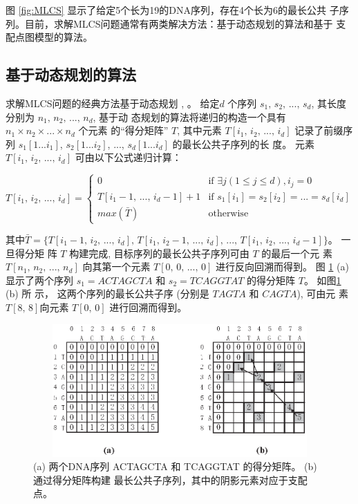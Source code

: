 图 \ref{fig:MLCS} 显示了给定5个长为19的DNA序列，存在4个长为6的最长公共
子序列。目前，求解MLCS问题通常有两类解决方法：基于动态规划的算法和基于
支配点图模型的算法。

\subsection{基于动态规划的算法}

求解MLCS问题的经典方法基于动态规划 \cite{Smith1981}, \cite{Sankoff1972}。 给定$d$
个序列 $s_1,\, s_2,\,...,\, s_d$, 其长度分别为 $n_1,\, n_2,\, ...,\, n_d$, 基于动
态规划的算法将递归的构造一个具有 $n_1 \times n_2 \times ... \times n_d$ 个元素
的“得分矩阵” $T$, 其中元素 $T[i_1,\, i_2,\, ...,\, i_d]$ 记录了前缀序
列 $s_1[1...i_1]$, $s_2[1...i_2]$, ..., $s_d[1...i_d]$ 的最长公共子序列的长
度。 元素 $T[i_1,\, i_2,\, ...,\, i_d]$ 可由以下公式递归计算：

\begin{equation}
  T[i_1,\, i_2,\, ...,\, i_d] =
  \begin{cases}
    0 & \text{if $\exists j(1 \leq j \leq d), i_j = 0$}\\
    T[i_1-1,\, ...,\, i_d-1] + 1  & \text{if $s_1[i_1] = s_2[i_2] =
      ... = s_d[i_d]$}\\
    max(\bar{T}) & \text{otherwise}
  \end{cases}
\end{equation}

其中$\bar{T} = \{T[i_1-1,\, i_2,\, ...,\, i_d],\, T[i_1,\, i_2-1,\,
...,\, i_d],\, ...,\, T[i_1,\, i_2,\, ...,\, i_d-1]\}$。 一旦得分矩
阵 $T$ 构建完成, 目标序列的最长公共子序列可由 $T$ 的最后一个元
素 $T[n_1,\, n_2,\, ...,\, n_d]$ 向其第一个元素 $T[0,\, 0,\, ...,\,
0]$ 进行反向回溯而得到。 图 \ref{fig:DM} (a) 显示了两个序列 $s_1 =
ACTAGCTA$ 和 $s_2 = TCAGGTAT$ 的得分矩阵 $T$。 如图\ref{fig:DM} (b) 所
示， 这两个序列的最长公共子序 (分别是 $TAGTA$ 和 $CAGTA$), 可由元
素 $T[8,\, 8]$向元素 $T[0,\, 0]$ 进行回溯而得到。

\begin{figure}[!h]
  \centering
  \includegraphics[height=2in, width=4.5in]{figures/1_Introduction/score_table}
  \vspace{1em}
  \caption{(a) 两个DNA序列 ACTAGCTA 和 TCAGGTAT 的得分矩阵。 (b) 通过得分矩阵构建
    最长公共子序列，其中的阴影元素对应于支配点。}
\label{fig:DM}
\end{figure}

